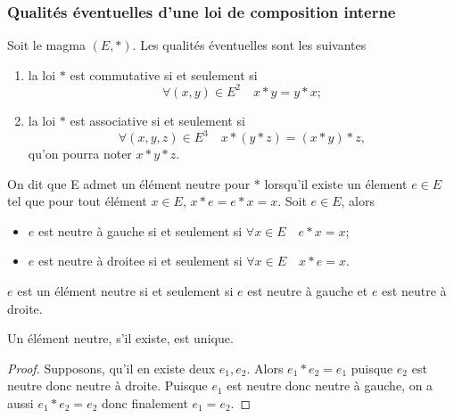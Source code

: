 \subsubsection{Qualités éventuelles d'une loi de composition interne}
Soit le magma $(E,*)$. Les qualités éventuelles sont les suivantes
\begin{enumerate}
\item la loi $*$ est commutative si et seulement si
  \begin{equation}
    \forall (x,y) \in E^2 \quad x*y=y*x;
  \end{equation}
\item la loi $*$ est associative si et seulement si
  \begin{equation}
    \forall (x,y,z) \in E^3 \quad x*(y*z)=(x*y)*z,
  \end{equation}
  qu'on pourra noter $x*y*z$.
\end{enumerate}
On dit que E admet un élément neutre pour $*$ lorsqu'il existe un élement $e \in E$ tel que pour tout élément $x \in E$, $x*e=e*x=x$. Soit $e \in E$, alors 
\begin{itemize}
\item $e$ est neutre à gauche si et seulement si $\forall x \in E \quad e * x =x$;
\item $e$ est neutre à droitee si et seulement si $\forall x \in E \quad x * e =x$.
\end{itemize}
$e$ est un élément neutre si et seulement si $e$ est neutre à gauche et $e$ est neutre à droite.
\begin{prop}
  Un élément neutre, s'il existe, est unique.
\end{prop}
\begin{proof}
  Supposons, qu'il en existe deux $e_1, e_2$. Alors $e_1*e_2 =e_1$ puisque $e_2$ est neutre donc neutre à droite. Puisque $e_1$ est neutre donc neutre à gauche, on a aussi $e_1*e_2=e_2$ donc finalement $e_1=e_2$.
\end{proof}

